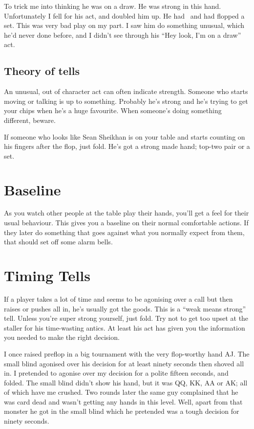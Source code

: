 To trick me into thinking he was on a draw. He was strong in
this hand. Unfortunately I fell for his act, and doubled him up.
He had \ninec\nineh\, and had flopped a set. This
was very bad play on my part. I saw him do something unusual, which
he'd never done before, and I didn't see through his
``Hey look, I'm on a draw'' act.

\subsection{Theory of tells}

An unusual, out of character act can often indicate
strength. Someone who starts moving or talking is up to something.
Probably he's strong and he's trying to get your chips when he's
a huge favourite. When someone's doing something different, beware.

If someone who looks like Sean Sheikhan is on your table and starts
counting on his fingers after the flop, just fold. He's
got a strong made hand; top-two pair or a set.

\section{Baseline}

As you watch other people at the table play their hands, you'll get a
feel for their usual behaviour. This gives you a baseline on their
normal comfortable actions. If they later do something that goes
against what you normally expect from them, that should set off some
alarm bells.

\section{Timing Tells}

If a player takes a lot of time and seems to be agonising over a call
but then raises or pushes all in, he's usually got the goods.
This is a ``weak means strong'' tell.
Unless you're super strong yourself, just fold.
Try not to get too upset at the staller for
his time-wasting antics. At least his act has given you the
information you needed to make the right decision.

I once raised preflop in a big tournament with the very flop-worthy hand
AJ. The small blind agonised over his decision for at least ninety
seconds then shoved all in. I pretended to agonise over my decision
for a polite fifteen seconds, and folded. The small blind didn't show
his hand, but it was QQ, KK, AA or AK; all of which have me crushed.
Two rounds later the same
guy complained that he was card dead and wasn't getting any hands
in this level. Well, apart from that monster he got in the small blind
which he pretended was a tough decision for ninety seconds.


